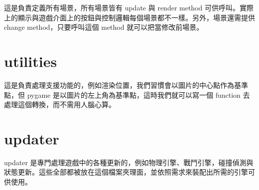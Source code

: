 \documentclass[12pt, a4paper]{NGPLB}
\begin{document}
這是負責定義所有場景，所有場景皆有 update 與 render method 可供呼叫。實際上的顯示與遊戲介面上的按鈕與控制邏輯每個場景都不一樣。另外，場景還需提供 change method，只要呼叫這個 method 就可以把當修改前場景。

\section{utilities}

這是負責處理支援功能的，例如渲染位置，我們習慣會以圖片的中心點作為基準點，但 pygame 是以圖片的左上角為基準點，這時我們就可以寫一個 function 去處理這個轉換，而不需用人腦心算。

\section{updater}

updater 是專門處理遊戲中的各種更新的，例如物理引擎、戰鬥引擎，碰撞偵測與狀態更新。這些全部都被放在這個檔案夾理面，並依照需求來裝配出所需的引擎可供使用。
\end{document}
